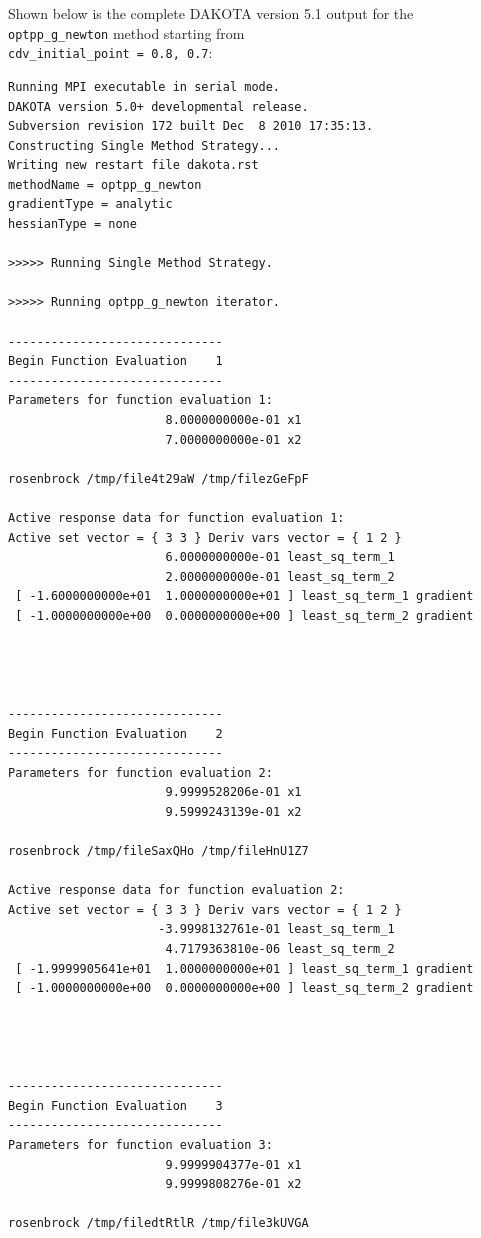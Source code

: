 Shown below is the complete DAKOTA version 5.1 output for the
\texttt{optpp\_g\_newton} method starting from\\
\texttt{cdv\_initial\_point = 0.8, 0.7}:
\begin{small}
\begin{verbatim}
Running MPI executable in serial mode.
DAKOTA version 5.0+ developmental release.
Subversion revision 172 built Dec  8 2010 17:35:13.
Constructing Single Method Strategy...
Writing new restart file dakota.rst
methodName = optpp_g_newton
gradientType = analytic
hessianType = none

>>>>> Running Single Method Strategy.

>>>>> Running optpp_g_newton iterator.

------------------------------
Begin Function Evaluation    1
------------------------------
Parameters for function evaluation 1:
                      8.0000000000e-01 x1
                      7.0000000000e-01 x2

rosenbrock /tmp/file4t29aW /tmp/filezGeFpF

Active response data for function evaluation 1:
Active set vector = { 3 3 } Deriv vars vector = { 1 2 }
                      6.0000000000e-01 least_sq_term_1
                      2.0000000000e-01 least_sq_term_2
 [ -1.6000000000e+01  1.0000000000e+01 ] least_sq_term_1 gradient
 [ -1.0000000000e+00  0.0000000000e+00 ] least_sq_term_2 gradient




------------------------------
Begin Function Evaluation    2
------------------------------
Parameters for function evaluation 2:
                      9.9999528206e-01 x1
                      9.5999243139e-01 x2

rosenbrock /tmp/fileSaxQHo /tmp/fileHnU1Z7

Active response data for function evaluation 2:
Active set vector = { 3 3 } Deriv vars vector = { 1 2 }
                     -3.9998132761e-01 least_sq_term_1
                      4.7179363810e-06 least_sq_term_2
 [ -1.9999905641e+01  1.0000000000e+01 ] least_sq_term_1 gradient
 [ -1.0000000000e+00  0.0000000000e+00 ] least_sq_term_2 gradient




------------------------------
Begin Function Evaluation    3
------------------------------
Parameters for function evaluation 3:
                      9.9999904377e-01 x1
                      9.9999808276e-01 x2

rosenbrock /tmp/filedtRtlR /tmp/file3kUVGA


\end{verbatim}
\end{small}
